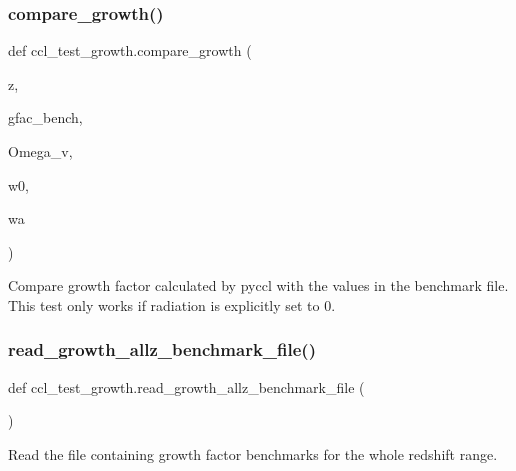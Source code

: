 \subsubsection{\texorpdfstring{compare\+\_\+growth()}{compare\_growth()}}
{\footnotesize\ttfamily def ccl\+\_\+test\+\_\+growth.\+compare\+\_\+growth (\begin{DoxyParamCaption}\item[{}]{z,  }\item[{}]{gfac\+\_\+bench,  }\item[{}]{Omega\+\_\+v,  }\item[{}]{w0,  }\item[{}]{wa }\end{DoxyParamCaption})}

\begin{DoxyVerb}Compare growth factor calculated by pyccl with the values in the benchmark
file. This test only works if radiation is explicitly set to 0.
\end{DoxyVerb}
 \mbox{\label{namespaceccl__test__growth_a2f8c205fa1a57bf8d2b31752e4798701}} 
\subsubsection{\texorpdfstring{read\+\_\+growth\+\_\+allz\+\_\+benchmark\+\_\+file()}{read\_growth\_allz\_benchmark\_file()}}
{\footnotesize\ttfamily def ccl\+\_\+test\+\_\+growth.\+read\+\_\+growth\+\_\+allz\+\_\+benchmark\+\_\+file (\begin{DoxyParamCaption}{ }\end{DoxyParamCaption})}

\begin{DoxyVerb}Read the file containing growth factor benchmarks for the whole redshift range.
\end{DoxyVerb}
 \mbox{\label{namespaceccl__test__growth_ac1171a8ec4ef57387a5b8ada42d58d7a}} 
